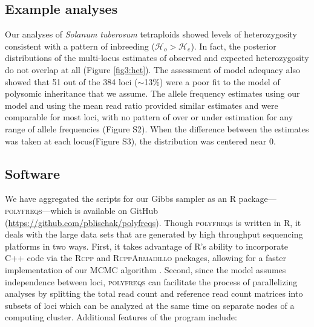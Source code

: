 \documentclass[11pt,english,letterpaper,oneside]{article}
\begin{document}
\medskip
\subsection{Example analyses}
\medskip

Our analyses of \textit{Solanum tuberosum} tetraploids showed levels of heterozygosity consistent with a pattern of inbreeding ($\mathcal{H}_o > \mathcal{H}_e$). In fact, the posterior distributions of the multi-locus estimates of observed and expected heterozygosity do not overlap at all (Figure \ref{fig3:het}). The assessment of model adequacy also showed that 51 out of the 384 loci ($\sim$13\%) were a poor fit to the model of polysomic inheritance that we assume. The allele frequency estimates using our model and using the mean read ratio provided similar estimates and were comparable for most loci, with no pattern of over or under estimation for any range of allele frequencies (Figure S2). When the difference between the estimates was taken at each locus(Figure S3), the distribution was centered near 0.
\medskip

\subsection{Software}
\medskip

We have aggregated the scripts for our Gibbs sampler as an R package---\textsc{polyfreqs}---which is available on GitHub (\url{https://github.com/pblischak/polyfreqs}). Though \textsc{polyfreqs} is written in R, it deals with the large data sets that are generated by high throughput sequencing platforms in two ways. First, it takes advantage of R's ability to incorporate C++ code via the \textsc{Rcpp} and \textsc{RcppArmadillo} packages, allowing for a faster implementation of our MCMC algorithm \citep{eddelbuettel2011rcpp,eddelbuettel2013rcppBook,eddelbuettel2014rcpparmadillo}. Second, since the model assumes independence between loci, \textsc{polyfreqs} can facilitate the process of parallelizing analyses by splitting the total read count and reference read count matrices into subsets of loci which can be analyzed at the same time on separate nodes of a computing cluster. Additional features of the program include:
\medskip
\end{document}
